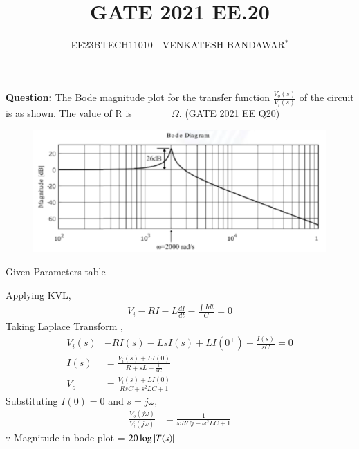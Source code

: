 \documentclass[journal,12pt,twocolumn]{IEEEtran}
\theoremstyle{remark}
\begin{document}

\vspace{3cm}

\title{GATE 2021 EE.20}
\author{EE23BTECH11010 - VENKATESH BANDAWAR$^{*}$%
}
\maketitle
\newpage
\bigskip
\textbf{Question:} The Bode magnitude plot for the transfer function $\frac{V_o(s)}{V_i(s)}$ of the circuit is as shown. The value of R is \_\_\_\_\_$\Omega$. \hfill(GATE 2021 EE Q20)
\begin{figure}[!ht]
    \centering
    
\end{figure}
\begin{figure}[!ht]
    \centering
    \includegraphics[width=\columnwidth]{figs/bode.png}
\end{figure}
\solution
\begin{table}[!ht]
    \centering
    
    \caption{Given Parameters table}
    \label{Given Parameters table_2021_EE_20}
\end{table}
Applying KVL,
\begin{align}
    V_i - R I - L\frac{dI}{dt} - \frac{\int I dt}{C} = 0
\end{align}
Taking Laplace Transform ,
\begin{align}
    V_i(s) &- RI(s) - LsI(s) + LI(0^+) - \frac{I(s)}{sC} = 0\\
    I(s) &= \frac{V_i(s) + LI(0)}{R + sL + \frac{1}{sC}}\\
    V_o &= \frac{V_i(s) + LI(0)}{RsC + s^2LC + 1}
\end{align}
Substituting $I(0) = 0$ and $s = j\omega$,
\begin{align}
    \frac{V_o(j\omega)}{V_i(j\omega)} &= \frac{1}{\omega RCj -\omega^2LC + 1} 
\end{align}
$\because$ Magnitude in bode plot = $20\log \left\vert T(s)\right\vert$\\
\end{document}
